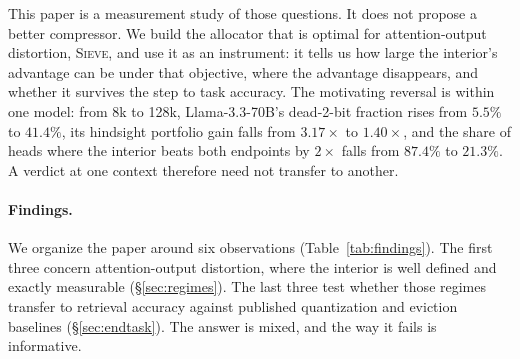 \documentclass{article}
\newcommand{\sieve}{\textsc{Sieve}}
\theoremstyle{definition}
\begin{document}
This paper is a measurement study of those questions.  It does not propose a better compressor.  We build the allocator that is optimal for attention-output distortion, \sieve{}, and use it as an instrument: it tells us how large the interior's advantage can be under that objective, where the advantage disappears, and whether it survives the step to task accuracy.  The motivating reversal is within one model: from 8k to 128k, Llama-3.3-70B's dead-2-bit fraction rises from $5.5\%$ to $41.4\%$, its hindsight portfolio gain falls from $3.17\times$ to $1.40\times$, and the share of heads where the interior beats both endpoints by $2\times$ falls from $87.4\%$ to $21.3\%$.  A verdict at one context therefore need not transfer to another.

\paragraph{Findings.}  We organize the paper around six observations (Table~\ref{tab:findings}).  The first three concern attention-output distortion, where the interior is well defined and exactly measurable (\S\ref{sec:regimes}).  The last three test whether those regimes transfer to retrieval accuracy against published quantization and eviction baselines (\S\ref{sec:endtask}).  The answer is mixed, and the way it fails is informative.
\end{document}
